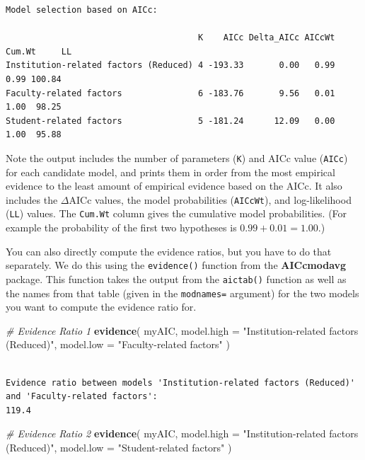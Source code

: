 \documentclass[]{book}
\newenvironment{Shaded}{\begin{snugshade}}{\end{snugshade}}
\newcommand{\CommentTok}[1]{\textcolor[rgb]{0.56,0.35,0.01}{\textit{#1}}}
\newcommand{\DataTypeTok}[1]{\textcolor[rgb]{0.13,0.29,0.53}{#1}}
\newcommand{\KeywordTok}[1]{\textcolor[rgb]{0.13,0.29,0.53}{\textbf{#1}}}
\newcommand{\NormalTok}[1]{#1}
\newcommand{\StringTok}[1]{\textcolor[rgb]{0.31,0.60,0.02}{#1}}
\begin{document}
\begin{verbatim}
Model selection based on AICc:

                                      K    AICc Delta_AICc AICcWt Cum.Wt     LL
Institution-related factors (Reduced) 4 -193.33       0.00   0.99   0.99 100.84
Faculty-related factors               6 -183.76       9.56   0.01   1.00  98.25
Student-related factors               5 -181.24      12.09   0.00   1.00  95.88
\end{verbatim}

Note the output includes the number of parameters (\texttt{K}) and AICc value (\texttt{AICc}) for each candidate model, and prints them in order from the most empirical evidence to the least amount of empirical evidence based on the AICc. It also includes the \(\Delta\)AICc values, the model probabilities (\texttt{AICcWt}), and log-likelihood (\texttt{LL}) values. The \texttt{Cum.Wt} column gives the cumulative model probabilities. (For example the probability of the first two hypotheses is \(0.99 + 0.01 = 1.00\).)

You can also directly compute the evidence ratios, but you have to do that separately. We do this using the \texttt{evidence()} function from the \textbf{AICcmodavg} package. This function takes the output from the \texttt{aictab()} function as well as the names from that table (given in the \texttt{modnames=} argument) for the two models you want to compute the evidence ratio for.

\begin{Shaded}
\begin{Highlighting}[]
\CommentTok{# Evidence Ratio 1}
\KeywordTok{evidence}\NormalTok{(}
\NormalTok{  myAIC,}
  \DataTypeTok{model.high =} \StringTok{"Institution-related factors (Reduced)"}\NormalTok{,}
  \DataTypeTok{model.low =} \StringTok{"Faculty-related factors"}
\NormalTok{  )}
\end{Highlighting}
\end{Shaded}

\begin{verbatim}

Evidence ratio between models 'Institution-related factors (Reduced)' and 'Faculty-related factors':
119.4 
\end{verbatim}

\begin{Shaded}
\begin{Highlighting}[]
\CommentTok{# Evidence Ratio 2}
\KeywordTok{evidence}\NormalTok{(}
\NormalTok{  myAIC,}
  \DataTypeTok{model.high =} \StringTok{"Institution-related factors (Reduced)"}\NormalTok{,}
  \DataTypeTok{model.low =} \StringTok{"Student-related factors"}
\NormalTok{  )}
\end{Highlighting}
\end{Shaded}
\end{document}
